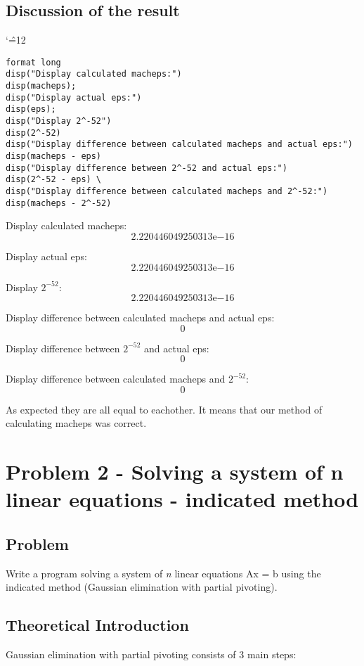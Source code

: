 \documentclass{report}
\newenvironment{simplechar}{%
   \catcode`\^=12
}{}
\begin{document}
\section{Discussion of the result}
\begin{simplechar}
\begin{lstlisting}
format long
disp("Display calculated macheps:")
disp(macheps);
disp("Display actual eps:")
disp(eps);
disp("Display 2^-52")
disp(2^-52)
disp("Display difference between calculated macheps and actual eps:")
disp(macheps - eps)
disp("Display difference between 2^-52 and actual eps:")
disp(2^-52 - eps) \
disp("Display difference between calculated macheps and 2^-52:")
disp(macheps - 2^-52)
\end{lstlisting}
\end{simplechar}
Display calculated macheps:
     \[2.220446049250313\mathrm{e}{-16}\]

Display actual eps:
     \[2.220446049250313\mathrm{e}{-16}\]

Display $2^{-52}$:
     \[2.220446049250313\mathrm{e}{-16}\]

Display difference between calculated macheps and actual eps:
     \[0\]

Display difference between $2^{-52}$ and actual eps:
          \[0\]

Display difference between calculated macheps and $2^{-52}$:
         \[0\]

As expected they are all equal to eachother. It means that our method of calculating macheps was correct.


\chapter{Problem 2 - Solving a system of n linear equations - indicated method}

\section{Problem}
Write a program solving a system of \textit{n} linear equations Ax = b using the indicated method (Gaussian elimination with partial pivoting).

\section{Theoretical Introduction}
Gaussian elimination with partial pivoting consists of 3 main steps:
\end{document}
